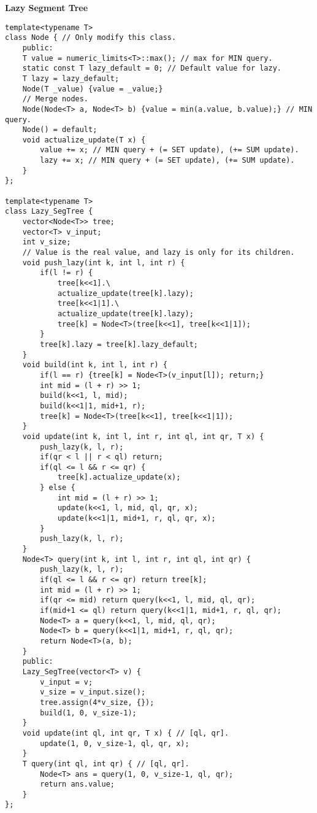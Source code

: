 \documentclass[a4paper,10pt]{article}
\newcommand{\titleAlg}[1]{\vspace{-10pt}
\begin{center}\textbf{#1}\end{center} \vspace{-10pt}}
\begin{document}
\titleAlg{Lazy Segment Tree}
\begin{multicols}{2}
\begin{verbatim}
template<typename T>
class Node { // Only modify this class.
    public:
    T value = numeric_limits<T>::max(); // max for MIN query.
    static const T lazy_default = 0; // Default value for lazy.
    T lazy = lazy_default;
    Node(T _value) {value = _value;}
    // Merge nodes.
    Node(Node<T> a, Node<T> b) {value = min(a.value, b.value);} // MIN query.
    Node() = default;
    void actualize_update(T x) {
        value += x; // MIN query + (= SET update), (+= SUM update).
        lazy += x; // MIN query + (= SET update), (+= SUM update).
    }
};

template<typename T>
class Lazy_SegTree {
    vector<Node<T>> tree;
    vector<T> v_input;
    int v_size;
    // Value is the real value, and lazy is only for its children.
    void push_lazy(int k, int l, int r) {
        if(l != r) {
            tree[k<<1].\
            actualize_update(tree[k].lazy);
            tree[k<<1|1].\
            actualize_update(tree[k].lazy);
            tree[k] = Node<T>(tree[k<<1], tree[k<<1|1]);
        }
        tree[k].lazy = tree[k].lazy_default;
    }
    void build(int k, int l, int r) {
        if(l == r) {tree[k] = Node<T>(v_input[l]); return;}
        int mid = (l + r) >> 1;
        build(k<<1, l, mid);
        build(k<<1|1, mid+1, r);
        tree[k] = Node<T>(tree[k<<1], tree[k<<1|1]);
    }
    void update(int k, int l, int r, int ql, int qr, T x) {
        push_lazy(k, l, r);
        if(qr < l || r < ql) return;
        if(ql <= l && r <= qr) {
            tree[k].actualize_update(x);
        } else {
            int mid = (l + r) >> 1;
            update(k<<1, l, mid, ql, qr, x);
            update(k<<1|1, mid+1, r, ql, qr, x);
        }
        push_lazy(k, l, r);
    }
    Node<T> query(int k, int l, int r, int ql, int qr) {
        push_lazy(k, l, r);
        if(ql <= l && r <= qr) return tree[k];
        int mid = (l + r) >> 1;
        if(qr <= mid) return query(k<<1, l, mid, ql, qr);
        if(mid+1 <= ql) return query(k<<1|1, mid+1, r, ql, qr);
        Node<T> a = query(k<<1, l, mid, ql, qr);
        Node<T> b = query(k<<1|1, mid+1, r, ql, qr);
        return Node<T>(a, b);
    }
    public:
    Lazy_SegTree(vector<T> v) {
        v_input = v;
        v_size = v_input.size();
        tree.assign(4*v_size, {});
        build(1, 0, v_size-1);
    }
    void update(int ql, int qr, T x) { // [ql, qr].
        update(1, 0, v_size-1, ql, qr, x);
    }
    T query(int ql, int qr) { // [ql, qr].
        Node<T> ans = query(1, 0, v_size-1, ql, qr);
        return ans.value;
    }
};
\end{verbatim}
\end{multicols}
\end{document}

